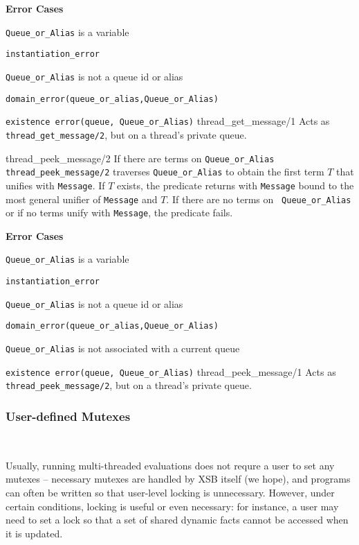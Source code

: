 \begin{description}
{\bf Error Cases}
\bi
\item 	{\tt Queue\_or\_Alias} is a variable
\bi
\item 	{\tt instantiation\_error}
\ei
%
\item 	{\tt Queue\_or\_Alias} is not a queue id or alias
\bi
\item 	{\tt domain\_error(queue\_or\_alias,Queue\_or\_Alias)}
\ei
\bi
\item   {\tt existence error(queue, Queue\_or\_Alias)}
\ei
\ei
%
{thread\_get\_message/1}
%
Acts as {\tt thread\_get\_message/2}, but on a thread's private queue.

{thread\_peek\_message/2}
%
If there are terms on {\tt Queue\_or\_Alias} {\tt
  thread\_peek\_message/2} traverses {\tt Queue\_or\_Alias} to obtain
the first term $T$ that unifies with {\tt Message}.  If $T$ exists,
the predicate returns with {\tt Message} bound to the most general
unifier of {\tt Message} and $T$.  If there are no terms on {\tt
  Queue\_or\_Alias} or if no terms unify with {\tt Message}, the predicate fails.

{\bf Error Cases}
\bi
\item 	{\tt Queue\_or\_Alias} is a variable
\bi
\item 	{\tt instantiation\_error}
\ei
%
\item 	{\tt Queue\_or\_Alias} is not a queue id or alias
\bi
\item 	{\tt domain\_error(queue\_or\_alias,Queue\_or\_Alias)}
\ei
\item {\tt Queue\_or\_Alias} is not associated with a current queue
\bi
\item   {\tt existence error(queue, Queue\_or\_Alias)}
\ei
\ei
%
{thread\_peek\_message/1}
%
Acts as {\tt thread\_peek\_message/2}, but on a thread's private queue.

\end{description}

\subsubsection{User-defined Mutexes}~\label{sec:mutexes}
%

Usually, running multi-threaded evaluations does not requre a user to
set any mutexes -- necessary mutexes are handled by XSB itself (we
hope), and programs can often be written so that user-level locking is
unnecessary.  However, under certain conditions, locking is useful or
even necessary: for instance, a user may need to set a lock so that a
set of shared dynamic facts cannot be accessed when it is updated.

